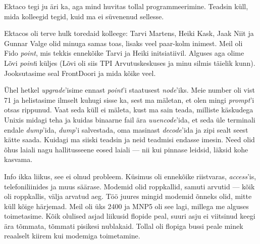 
Ektaco tegi ju äri ka, aga mind huvitas tollal 
programmeerimine. Teadsin küll, mida kolleegid tegid, kuid ma 
ei süvenenud sellesse.


Ektacos oli terve hulk toredaid kolleege: 
Tarvi Martens, Heiki Kask, Jaak 
Niit ja Gunnar Valge olid 
minuga samas toas, lisaks veel paar-kolm inimest. Meil oli 
Fido \emph{point}, mis tekkis ennekõike Tarvi ja Heiki 
initsiatiivil. Alguses aga olime Lõvi \emph{point}i küljes 
(Lõvi oli siis TPI 
Arvutuskeskuses ja minu silmis täielik
kunn). Jooksutasime seal FrontDoori ja mida kõike veel. 

Ühel hetkel \emph{upgrade}'isime ennast \emph{point}'i staatusest 
\emph{node}'iks. Meie number oli vist 71 ja helistasime ilmselt
kuhugi sisse ka, sest ma mäletan, et olen mingi \emph{prompt}'i otsas 
rippunud. Vaat seda küll ei mäleta, kust ma sain teada, milliste käskudega 
Unixis midagi teha ja kuidas binaarne fail ära 
\emph{uuencode}'ida, et seda üle terminali endale 
\emph{dump}'ida, \emph{dump}'i salvestada, oma masinast \emph{decode}'ida ja 
zipi sealt seest kätte saada. Kuidagi ma siiski teadsin ja neid teadmisi endasse
imesin. Need olid 
õhus laiali nagu hallitusseene eosed laiali --- nii kui pinnase 
leidsid, läksid kohe kasvama. 


Info ikka liikus, see ei olnud probleem. Küsimus oli 
ennekõike riistvaras, \emph{access}'is, telefoniliinides ja muus säärase. Modemid olid roppkallid, samuti arvutid --- kõik oli roppkallis, 
välja arvatud aeg. Töö juures mingid modemid õnneks olid, mitte küll 
kõige härjemad. Meil oli üks 2400 ja MNP5 oli see lagi, millega me alguses toimetasime. 
Kõik olulised asjad liikusid flopide peal, suuri asju ei viitsinud keegi 
ära tõmmata, tõmmati pisikesi nublakaid. Tollal oli flopiga bussi peale 
minek reaalselt kiirem kui modemiga toimetamine.

